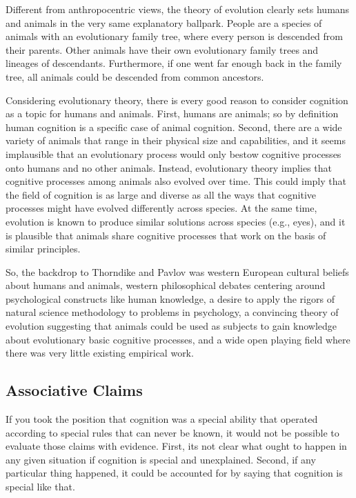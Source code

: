 \documentclass[
  oneside,
  12pt]{crumpbook}
\begin{document}
Different from anthropocentric views, the theory of evolution clearly sets humans and animals in the very same explanatory ballpark. People are a species of animals with an evolutionary family tree, where every person is descended from their parents. Other animals have their own evolutionary family trees and lineages of descendants. Furthermore, if one went far enough back in the family tree, all animals could be descended from common ancestors.

Considering evolutionary theory, there is every good reason to consider cognition as a topic for humans and animals. First, humans are animals; so by definition human cognition is a specific case of animal cognition. Second, there are a wide variety of animals that range in their physical size and capabilities, and it seems implausible that an evolutionary process would only bestow cognitive processes onto humans and no other animals. Instead, evolutionary theory implies that cognitive processes among animals also evolved over time. This could imply that the field of cognition is as large and diverse as all the ways that cognitive processes might have evolved differently across species. At the same time, evolution is known to produce similar solutions across species (e.g., eyes), and it is plausible that animals share cognitive processes that work on the basis of similar principles.

So, the backdrop to Thorndike and Pavlov was western European cultural beliefs about humans and animals, western philosophical debates centering around psychological constructs like human knowledge, a desire to apply the rigors of natural science methodology to problems in psychology, a convincing theory of evolution suggesting that animals could be used as subjects to gain knowledge about evolutionary basic cognitive processes, and a wide open playing field where there was very little existing empirical work.

\hypertarget{associative-claims}{%
\subsection{Associative Claims}\label{associative-claims}}

If you took the position that cognition was a special ability that operated according to special rules that can never be known, it would not be possible to evaluate those claims with evidence. First, its not clear what ought to happen in any given situation if cognition is special and unexplained. Second, if any particular thing happened, it could be accounted for by saying that cognition is special like that.
\end{document}
